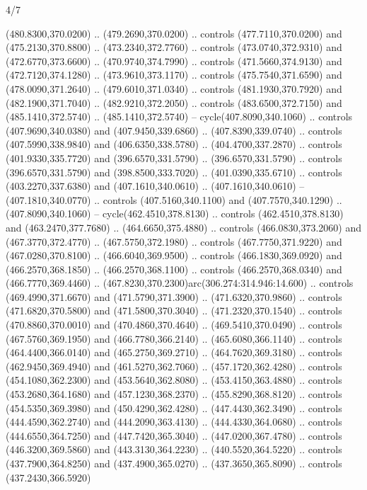 \begin{flagdescription}{4/7}
\begin{scope}[shift={(0.5\flaglength,0.5\flagwidth)},scale=\flagwidth*\stretchfactor/820]
\begin{scope}[scale=1.87,xshift=-138mm,yshift=75mm]
\begin{scope}[y=0.8pt, x=0.8pt, yscale=-1, xscale=1]
\begin{scope}[fill=c9ca168]
  (480.8300,370.0200) .. (479.2690,370.0200) .. controls (477.7110,370.0200) and
  (475.2130,370.8800) .. (473.2340,372.7760) .. controls (473.0740,372.9310) and
  (472.6770,373.6600) .. (470.9740,374.7990) .. controls (471.5660,374.9130) and
  (472.7120,374.1280) .. (473.9610,373.1170) .. controls (475.7540,371.6590) and
  (478.0090,371.2640) .. (479.6010,371.0340) .. controls (481.1930,370.7920) and
  (482.1900,371.7040) .. (482.9210,372.2050) .. controls (483.6500,372.7150) and
  (485.1410,372.5740) .. (485.1410,372.5740) -- cycle(407.8090,340.1060) ..
  controls (407.9690,340.0380) and (407.9450,339.6860) .. (407.8390,339.0740) ..
  controls (407.5990,338.9840) and (406.6350,338.5780) .. (404.4700,337.2870) ..
  controls (401.9330,335.7720) and (396.6570,331.5790) .. (396.6570,331.5790) ..
  controls (396.6570,331.5790) and (398.8500,333.7020) .. (401.0390,335.6710) ..
  controls (403.2270,337.6380) and (407.1610,340.0610) .. (407.1610,340.0610) --
  (407.1810,340.0770) .. controls (407.5160,340.1100) and (407.7570,340.1290) ..
  (407.8090,340.1060) -- cycle(462.4510,378.8130) .. controls
  (462.4510,378.8130) and (463.2470,377.7680) .. (464.6650,375.4880) .. controls
  (466.0830,373.2060) and (467.3770,372.4770) .. (467.5750,372.1980) .. controls
  (467.7750,371.9220) and (467.0280,370.8100) .. (466.6040,369.9500) .. controls
  (466.1830,369.0920) and (466.2570,368.1850) .. (466.2570,368.1100) .. controls
  (466.2570,368.0340) and (466.7770,369.4460) ..
  (467.8230,370.2300)arc(306.274:314.946:14.600) .. controls (469.4990,371.6670)
  and (471.5790,371.3900) .. (471.6320,370.9860) .. controls (471.6820,370.5800)
  and (471.5800,370.3040) .. (471.2320,370.1540) .. controls (470.8860,370.0010)
  and (470.4860,370.4640) .. (469.5410,370.0490) .. controls (467.5760,369.1950)
  and (466.7780,366.2140) .. (465.6080,366.1140) .. controls (464.4400,366.0140)
  and (465.2750,369.2710) .. (464.7620,369.3180) .. controls (462.9450,369.4940)
  and (461.5270,362.7060) .. (457.1720,362.4280) .. controls (454.1080,362.2300)
  and (453.5640,362.8080) .. (453.4150,363.4880) .. controls (453.2680,364.1680)
  and (457.1230,368.2370) .. (455.8290,368.8120) .. controls (454.5350,369.3980)
  and (450.4290,362.4280) .. (447.4430,362.3490) .. controls (444.4590,362.2740)
  and (444.2090,363.4130) .. (444.4330,364.0680) .. controls (444.6550,364.7250)
  and (447.7420,365.3040) .. (447.0200,367.4780) .. controls (446.3200,369.5860)
  and (443.3130,364.2230) .. (440.5520,364.5220) .. controls (437.7900,364.8250)
  and (437.4900,365.0270) .. (437.3650,365.8090) .. controls (437.2430,366.5920)

\end{scope}
\end{scope}
\end{scope}
\end{scope}
\end{flagdescription}

